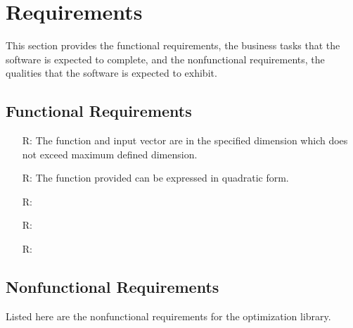 \documentclass[12pt]{article}
\newcounter{reqnum} %
\begin{document}
\section{Requirements}


This section provides the functional requirements, the business tasks that the
software is expected to complete, and the nonfunctional requirements, the
qualities that the software is expected to exhibit.

\newpage
\subsection{Functional Requirements}

\noindent 
\begin{itemize}

\item[R\refstepcounter{reqnum}\thereqnum \label{r:maxdim}:] The function and input vector are in the specified dimension which does not exceed maximum defined dimension.

\item[R\refstepcounter{reqnum}\thereqnum \label{r:quadratic}:] The function provided can be expressed in quadratic form. 

\item[R\refstepcounter{reqnum}\thereqnum \label{R_Calculate}:] 

\item[R\refstepcounter{reqnum}\thereqnum \label{R_VerifyOutput}:]

\item[R\refstepcounter{reqnum}\thereqnum \label{R_Output}:] 

\end{itemize}


\subsection{Nonfunctional Requirements}

Listed here are the nonfunctional requirements for the optimization library.
\end{document}
